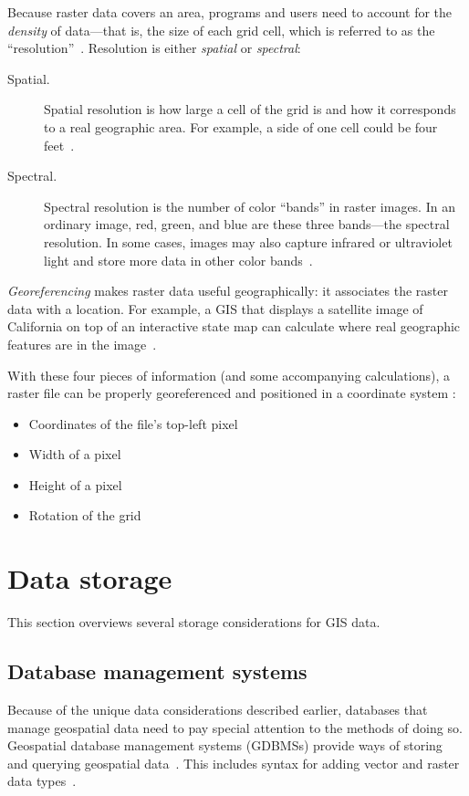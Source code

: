 Because raster data covers an area, programs and users need to account for the \textit{density} of data---that is, the size of each grid cell, which is referred to as the ``resolution''~\cite{gentle_intro}. Resolution is either \textit{spatial} or \textit{spectral}:

\begin{description}
  \item[Spatial.] Spatial resolution is how large a cell of the grid is and how it corresponds to a real geographic area. For example, a side of one cell could be four feet~\cite{gentle_intro}.
  \item[Spectral.] Spectral resolution is the number of color ``bands'' in raster images. In an ordinary image, red, green, and blue are these three bands---the spectral resolution. In some cases, images may also capture infrared or ultraviolet light and store more data in other color bands~\cite{gentle_intro}.
\end{description}

\textit{Georeferencing} makes raster data useful geographically: it associates the raster data with a location. For example, a GIS that displays a satellite image of California on top of an interactive state map can calculate where real geographic features are in the image~\cite{gentle_intro}.

With these four pieces of information (and some accompanying calculations), a raster file can be properly georeferenced and positioned in a coordinate system \cite{gentle_intro}:

\begin{itemize}
  \item Coordinates of the file's top-left pixel
  \item Width of a pixel
  \item Height of a pixel
  \item Rotation of the grid
\end{itemize}

\section{Data storage}
\label{storage}
This section overviews several storage considerations for GIS data.

\subsection{Database management systems}
Because of the unique data considerations described earlier, databases that manage geospatial data need to pay special attention to the methods of doing so. Geospatial database management systems (GDBMSs) provide ways of storing and querying geospatial data~\cite{Boundless}. This includes syntax for adding vector and raster data types~\cite{Boundless}.

